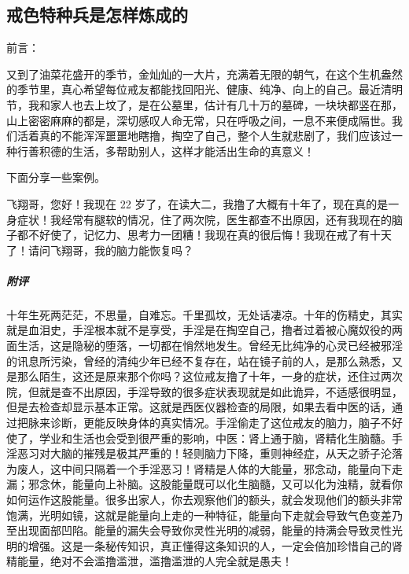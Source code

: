 \subsection{戒色特种兵是怎样炼成的}

前言：

又到了油菜花盛开的季节，金灿灿的一大片，充满着无限的朝气，在这个生机盎然的季节里，真心希望每位戒友都能找回阳光、健康、纯净、向上的自己。最近清明节，我和家人也去上坟了，是在公墓里，估计有几十万的墓碑，一块块都竖在那，山上密密麻麻的都是，深切感叹人命无常，只在呼吸之间，一息不来便成隔世。我们活着真的不能浑浑噩噩地瞎撸，掏空了自己，整个人生就悲剧了，我们应该过一种行善积德的生活，多帮助别人，这样才能活出生命的真意义！

下面分享一些案例。

\begin{case}
    飞翔哥，您好！我现在 22 岁了，在读大二，我撸了大概有十年了，现在真的是一身症状！我经常有腿软的情况，住了两次院，医生都查不出原因，还有我现在的脑子都不好使了，记忆力、思考力一团糟！我现在真的很后悔！我现在戒了有十天了！请问飞翔哥，我的脑力能恢复吗？
    \subparagraph{附评} 十年生死两茫茫，不思量，自难忘。千里孤坟，无处话凄凉。十年的伤精史，其实就是血泪史，手淫根本就不是享受，手淫是在掏空自己，撸者过着被心魔奴役的两面生活，这是隐秘的堕落，一切都在悄然地发生。曾经无比纯净的心灵已经被邪淫的讯息所污染，曾经的清纯少年已经不复存在，站在镜子前的人，是那么熟悉，又是那么陌生，这还是原来那个你吗？这位戒友撸了十年，一身的症状，还住过两次院，但就是查不出原因，手淫导致的很多症状表现就是如此诡异，不适感很明显，但是去检查却显示基本正常。这就是西医仪器检查的局限，如果去看中医的话，通过把脉来诊断，更能反映身体的真实情况。手淫偷走了这位戒友的脑力，脑子不好使了，学业和生活也会受到很严重的影响，中医：肾上通于脑，肾精化生脑髓。手淫恶习对大脑的摧残是极其严重的！轻则脑力下降，重则神经症，从天之骄子沦落为废人，这中间只隔着一个手淫恶习！肾精是人体的大能量，邪念动，能量向下走漏；邪念休，能量向上补脑。这股能量既可以化生脑髓，又可以化为浊精，就看你如何运作这股能量。很多出家人，你去观察他们的额头，就会发现他们的额头非常饱满，光明如镜，这就是能量向上走的一种特征，能量向下走就会导致气色变差乃至出现面部凹陷。能量的漏失会导致你灵性光明的减弱，能量的持满会导致灵性光明的增强。这是一条秘传知识，真正懂得这条知识的人，一定会倍加珍惜自己的肾精能量，绝对不会滥撸滥泄，滥撸滥泄的人完全就是愚夫！
\end{case}

